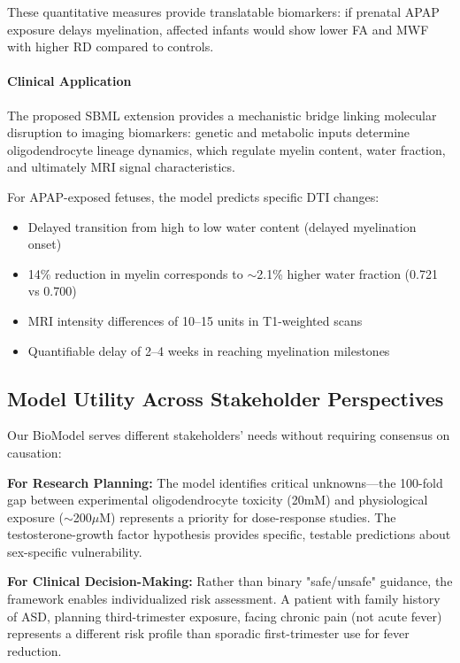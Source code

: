\documentclass[11pt]{article}
\let\oldsubsection\subsection
\renewcommand{\subsection}[1]{\oldsubsection{#1}\setlength{\leftskip}{0.75em}}
\begin{document}
These quantitative measures provide translatable biomarkers: if prenatal APAP exposure delays myelination, affected infants would show lower FA and MWF with higher RD compared to controls.

\paragraph{Clinical Application}
The proposed SBML extension provides a mechanistic bridge linking molecular disruption to imaging biomarkers: genetic and metabolic inputs determine oligodendrocyte lineage dynamics, which regulate myelin content, water fraction, and ultimately MRI signal characteristics.

For APAP-exposed fetuses, the model predicts specific DTI changes:
\begin{itemize}
\item Delayed transition from high to low water content (delayed myelination onset)
\item 14\% reduction in myelin corresponds to $\sim$2.1\% higher water fraction (0.721 vs 0.700)
\item MRI intensity differences of 10--15 units in T1-weighted scans
\item Quantifiable delay of 2--4 weeks in reaching myelination milestones
\end{itemize}

\subsection{Model Utility Across Stakeholder Perspectives}

Our BioModel serves different stakeholders' needs without requiring consensus on causation:

\textbf{For Research Planning:} The model identifies critical unknowns—the 100-fold gap between experimental oligodendrocyte toxicity (20mM) and physiological exposure ($\sim$200$\mu$M) represents a priority for dose-response studies. The testosterone-growth factor hypothesis provides specific, testable predictions about sex-specific vulnerability.

\textbf{For Clinical Decision-Making:} Rather than binary "safe/unsafe" guidance, the framework enables individualized risk assessment. A patient with family history of ASD, planning third-trimester exposure, facing chronic pain (not acute fever) represents a different risk profile than sporadic first-trimester use for fever reduction.
\end{document}
